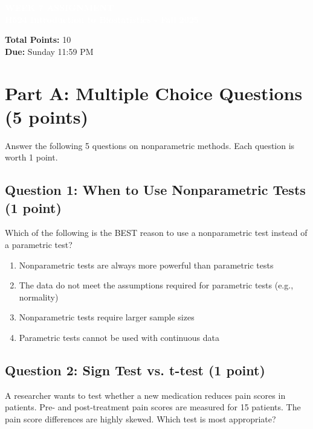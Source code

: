 \documentclass[10pt]{article}
\begin{document}
\begin{tcolorbox}[colback=osaorange,colframe=black,boxrule=2pt,arc=0pt,left=6pt,right=6pt,top=8pt,bottom=8pt]
\centering
\textcolor{white}{\textbf{\large WEEK 7 ASSIGNMENT}}\\
\textcolor{white}{\textbf{H524 Introduction to Biostatistics - Fall 2025}}
\end{tcolorbox}

\vspace{4pt}

\noindent\textbf{Total Points:} 10\\
\textbf{Due:} Sunday 11:59 PM

\vspace{8pt}

\section*{Part A: Multiple Choice Questions (5 points)}

Answer the following 5 questions on nonparametric methods. Each question is worth 1 point.

\subsection*{Question 1: When to Use Nonparametric Tests (1 point)}

Which of the following is the BEST reason to use a nonparametric test instead of a parametric test?

\begin{enumerate}[label=\Alph*., leftmargin=20pt]
\item Nonparametric tests are always more powerful than parametric tests
\item The data do not meet the assumptions required for parametric tests (e.g., normality)
\item Nonparametric tests require larger sample sizes
\item Parametric tests cannot be used with continuous data
\end{enumerate}

\subsection*{Question 2: Sign Test vs. t-test (1 point)}

A researcher wants to test whether a new medication reduces pain scores in patients. Pre- and post-treatment pain scores are measured for 15 patients. The pain score differences are highly skewed. Which test is most appropriate?
\end{document}
